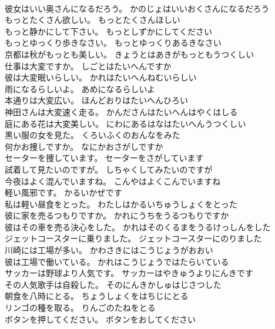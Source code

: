 \documentclass[8pt]{extreport}
\begin{document}
\begin{CJK}{UTF8}{min}
\\	彼女はいい奥さんになるだろう。	かのじょはいいおくさんになるだろう 
\\	もっとたくさん欲しい。	もっとたくさんほしい 
\\	もっと静かにして下さい。	もっとしずかにしてください 
\\	もっとゆっくり歩きなさい。	もっとゆっくりあるきなさい 
\\	京都は秋がもっとも美しい。	きょうとはあきがもっともうつくしい 
\\	仕事は大変ですか。	しごとはたいへんですか 
\\	彼は大変眠いらしい。	かれはたいへんねむいらしい 
\\	雨になるらしいよ。	あめになるらしいよ 
\\	本通りは大変広い。	ほんどおりはたいへんひろい 
\\	神田さんは大変速く走る。	かんださんはたいへんはやくはしる 
\\	庭にある花は大変美しい。	にわにあるはなはたいへんうつくしい 
\\	黒い服の女を見た。	くろいふくのおんなをみた 
\\	何かお捜しですか。	なにかおさがしですか 
\\	セーターを捜しています。	セーターをさがしています 
\\	試着して見たいのですが。	しちゃくしてみたいのですが 
\\	今夜はよく混んでいますね。	こんやはよくこんでいますね 
\\	軽い風邪です。	かるいかぜです 
\\	私は軽い昼食をとった。	わたしはかるいちゅうしょくをとった 
\\	彼に家を売るつもりですか。	かれにうちをうるつもりですか 
\\	彼はその車を売る決心をした。	かれはそのくるまをうるけっしんをした 
\\	ジェットコースターに乗りました。	ジェットコースターにのりました 
\\	川崎には工場が多い。	かわさきにはこうじょうがおおい 
\\	彼は工場で働いている。	かれはこうじょうではたらいている 
\\	サッカーは野球より人気です。	サッカーはやきゅうよりにんきです 
\\	その人気歌手は自殺した。	そのにんきかしゅはじさつした 
\\	朝食を八時にとる。	ちょうしょくをはちじにとる 
\\	リンゴの種を取る。	りんごのたねをとる 
\\	ボタンを押してください。	ボタンをおしてください 

\end{CJK}
\end{document}
